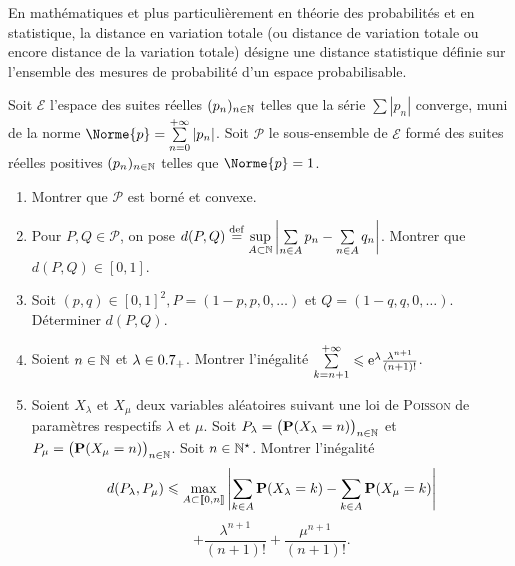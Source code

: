 En mathématiques et plus particulièrement en théorie des probabilités et en statistique, la distance en variation totale (ou distance de variation totale ou encore distance de la variation totale) désigne une distance statistique définie sur l'ensemble des mesures de probabilité d'un espace probabilisable. 

\begin{exercice}
Soit $\mathscr{E}$ l'espace des suites réelles $(p_n)_{n \in \N}$ telles que la série $\sum |p_n|$ converge, muni de la norme $\Norme{p} = \sum\limits_{n=0}^{+\infty} |p_n|$. Soit $\mathscr{P}$ le sous-ensemble de $\mathscr{E}$ formé des suites réelles positives $(p_n)_{n \in \N}$ telles que $\Norme{p}=1$.
\begin{enumerate}
    \item Montrer que $\mathscr{P}$ est borné et convexe. \\
    \item Pour $P, Q \in \mathscr{P}$, on pose $d(P, Q) \defeq \sup\limits_{A \subset \N} \left| \sum\limits_{n \in A} p_n - \sum\limits_{n \in A} q_n \right|$. Montrer que $d(P,Q) \in [0,1]$.
    \item Soit $(p,q) \in [0, 1]^2, P = (1-p, p, 0, \dots)$ et $Q = (1-q, q, 0, \dots)$. Déterminer $d(P, Q)$.
    \item Soient $n \in \N$ et $\lambda \in \Rp$. Montrer l'inégalité $\sum\limits_{k=n+1}^{+\infty} \leqslant \e^{\lambda} \frac{\lambda^{n+1}}{(n+1)!}$.
    \item Soient $X_\lambda$ et $X_\mu$ deux variables aléatoires suivant une loi de \textsc{Poisson} de paramètres respectifs $\lambda$ et $\mu$. Soit $P_\lambda = \big(\P(X_\lambda=n)\big)_{n \in \N}$ et $P_\mu = \big(\P(X_\mu=n)\big)_{n \in \N}$. Soit $n \in \Ne$. Montrer l'inégalité
    $$d(P_\lambda, P_\mu) \leqslant \max_{A \subset \llbracket 0, n \rrbracket} \left| \sum_{k \in A} \P(X_\lambda=k) - \sum_{k \in A} \P(X_\mu=k) \right|$$
    $$+ \frac{\lambda^{n+1}}{(n+1)!} + \frac{\mu^{n+1}}{(n+1)!}.$$
\end{enumerate}
\end{exercice}


